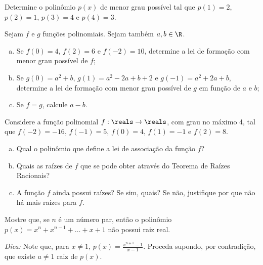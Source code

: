 \begin{exercise}
    Determine o polinômio $p(x)$ de menor grau possível tal que
    $p(1) = 2$, $p(2)=1$, $p(3) = 4$ e $p(4) = 3$.
\end{exercise}

\begin{exercise}
  Sejam $f$ e $g$ funções polinomiais. Sejam também $a, b \in \R$.
        
       \begin{enumerate}[a)]
            \item  Se $f(0) = 4$, $f(2)=6$ e $f(-2) = 10$, determine a lei de formação com menor grau possível de $f$;
            \item  Se $g(0) = a^2+b$, $g(1)=a^2-2a+b+2$ e $g(-1) = a^2 +2a+b$, determine a lei de formação com menor grau possível de $g$ em função de $a$ e $b$;
            \item  Se $f = g$, calcule $a-b$.
       \end{enumerate}
\end{exercise}

\begin{exercise}
    Considere a função polinomial $f: \reals \to \reals$, com grau no máximo 4, tal que $f(-2) = -16$, $f(-1) =5$, $f(0)= 4$, $f(1) = -1$ e $f(2) = 8$.

    \begin{enumerate}[a)]
        \item Qual o polinômio que define a lei de associação da função $f$?
        \item Quais as raízes de $f$ que se pode obter através do Teorema de Raízes Racionais?
        \item A função $f$ ainda possui raízes? Se sim, quais? Se não, justifique por que não há mais raízes para $f$.
    \end{enumerate}
\end{exercise}

\begin{exercise}
Mostre que, se $n$ é um número par, então o polinômio $p(x) =
x^n + x^{n-1} + \dots + x+1$ não possui raiz real.

\noindent \emph{Dica: } Note que, para $x \neq 1$, $p(x) =
\frac{x^{n+1}-1}{x-1}$. Proceda supondo, por contradição, que existe
$a \neq 1$ raiz de $p(x)$.
\end{exercise}
